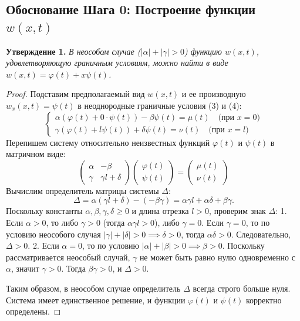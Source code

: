 \documentclass[a4paper,10pt]{article}
\begin{document}
\subsection*{Обоснование Шага 0: Построение функции $w(x,t)$}

\textbf{Утверждение 1.} \textit{В неособом случае ($|\alpha| + |\gamma| > 0$) функцию $w(x,t)$, удовлетворяющую граничным условиям, можно найти в виде $w(x,t) = \varphi(t) + x \psi(t)$.}

\begin{proof}
Подставим предполагаемый вид $w(x,t)$ и ее производную $w_x(x,t) = \psi(t)$ в неоднородные граничные условия (3) и (4):
\[
\begin{cases}
\alpha (\varphi(t) + 0 \cdot \psi(t)) - \beta \psi(t) = \mu(t) \quad \text{(при } x=0) \\
\gamma (\varphi(t) + l \psi(t)) + \delta \psi(t) = \nu(t) \quad \text{(при } x=l)
\end{cases}
\]
Перепишем систему относительно неизвестных функций $\varphi(t)$ и $\psi(t)$ в матричном виде:
\[
\begin{pmatrix} 
\alpha & -\beta \\ 
\gamma & \gamma l + \delta 
\end{pmatrix} 
\begin{pmatrix} 
\varphi(t) \\ 
\psi(t) 
\end{pmatrix} 
= 
\begin{pmatrix} 
\mu(t) \\ 
\nu(t) 
\end{pmatrix}
\]
Вычислим определитель матрицы системы $\Delta$:
\[
\Delta = \alpha(\gamma l + \delta) - (-\beta\gamma) = \alpha\gamma l + \alpha\delta + \beta\gamma.
\]
Поскольку константы $\alpha, \beta, \gamma, \delta \ge 0$ и длина отрезка $l > 0$, проверим знак $\Delta$:
1. Если $\alpha > 0$, то либо $\gamma > 0$ (тогда $\alpha\gamma l > 0$), либо $\gamma = 0$. Если $\gamma = 0$, то по условию неособого случая $|\gamma| + |\delta| > 0 \implies \delta > 0$, тогда $\alpha\delta > 0$. Следовательно, $\Delta > 0$.
2. Если $\alpha = 0$, то по условию $|\alpha| + |\beta| > 0 \implies \beta > 0$. Поскольку рассматривается неособый случай, $\gamma$ не может быть равно нулю одновременно с $\alpha$, значит $\gamma > 0$. Тогда $\beta\gamma > 0$, и $\Delta > 0$.

Таким образом, в неособом случае определитель $\Delta$ всегда строго больше нуля. Система имеет единственное решение, и функции $\varphi(t)$ и $\psi(t)$ корректно определены.
\end{proof}
\end{document}
